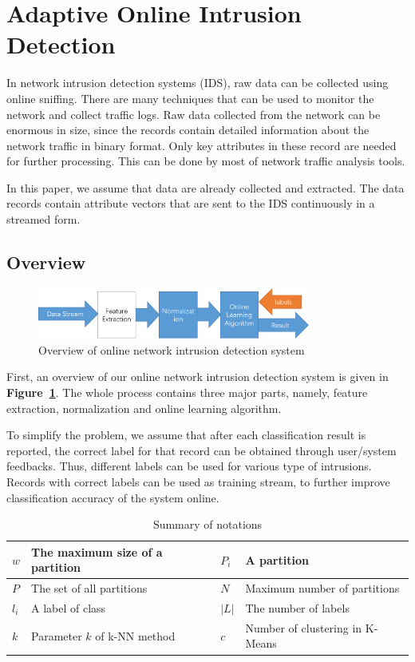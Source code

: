 \documentclass[runningheads]{llncs}
\begin{document}
	\section{Adaptive Online Intrusion Detection} \label{Our Method}
	
	In network intrusion detection systems (IDS), raw data can be collected using online sniffing. There are many techniques that can be used to monitor the network and collect traffic logs. Raw data collected from the network can be enormous in size, since the records contain detailed information about the network traffic in binary format. Only key attributes in these record are needed for further processing. This can be done by most of network traffic analysis tools.

	In this paper, we assume that data are already collected and extracted. The data records contain attribute vectors that are sent to the IDS continuously in a streamed form.

	\subsection{Overview}
	
	\begin{figure}
		\centering
		\includegraphics[width=0.8\textwidth]{overview}
		\caption{Overview of online network intrusion detection system}
		\label{fig:overview}
	\end{figure}
	
	First, an overview of our online network intrusion detection system is given in \textbf{Figure~\ref{fig:overview}}. The whole process contains three major parts, namely, feature extraction, normalization and online learning algorithm.
	
	To simplify the problem, we assume that after each classification result is reported, the correct label for that record can be obtained through user/system feedbacks. Thus, different labels can be used for various type of intrusions. Records with correct labels can be used as training stream, to further improve classification accuracy of the system online.
	
	\begin{table}
		\centering
		\caption{Summary of notations}\label{table:notation}
		\begin{tabular}{|m{1em}|m{16em}|m{1em}|m{16em}|}
			\hline
			$w$ & The maximum size of a partition & $P_i$ & A partition \\ 
			\hline
			$P$ & The set of all partitions & $N$ & Maximum number of partitions \\ 
			\hline
			$l_i$ & A label of class & $|L|$ & The number of labels  \\ 
			\hline
			$k$ & Parameter $k$ of k-NN method & $c$ & Number of clustering in K-Means \\
			\hline
		\end{tabular}
	\end{table}
	
\end{document}
